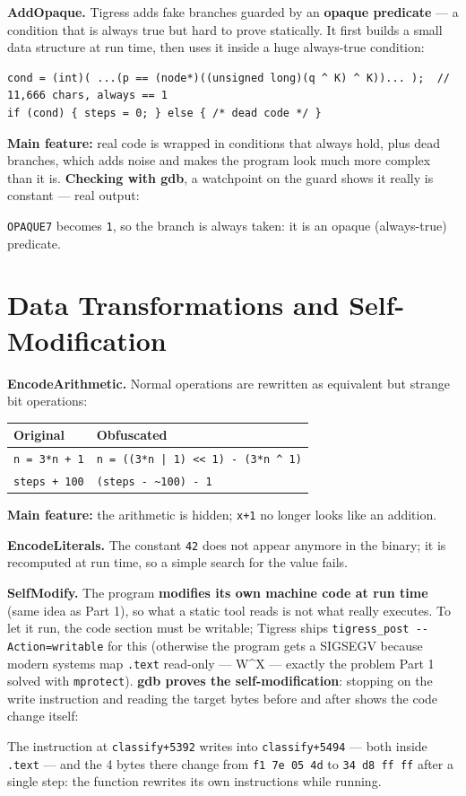 \documentclass[11pt,a4paper]{article}
\newcommand{\code}[1]{\texttt{\small #1}}
\begin{document}
\textbf{AddOpaque.} Tigress adds fake branches guarded by an \textbf{opaque predicate} --- a condition
that is always true but hard to prove statically. It first builds a small data structure at run time,
then uses it inside a huge always-true condition:
\begin{lstlisting}
cond = (int)( ...(p == (node*)((unsigned long)(q ^ K) ^ K))... );  // 11,666 chars, always == 1
if (cond) { steps = 0; } else { /* dead code */ }
\end{lstlisting}
\textbf{Main feature:} real code is wrapped in conditions that always hold, plus dead branches, which
adds noise and makes the program look much more complex than it is. \textbf{Checking with gdb}, a
watchpoint on the guard shows it really is constant --- real output:

\code{OPAQUE7} becomes \code{1}, so the branch is always taken: it is an opaque (always-true) predicate.

\section{Data Transformations and Self-Modification}
\textbf{EncodeArithmetic.} Normal operations are rewritten as equivalent but strange bit operations:
\begin{center}\small
\begin{tabular}{@{}ll@{}}
\toprule \textbf{Original} & \textbf{Obfuscated} \\ \midrule
\code{n = 3*n + 1} & \code{n = ((3*n | 1) << 1) - (3*n \^{} 1)} \\
\code{steps + 100} & \code{(steps - \~{}100) - 1} \\ \bottomrule
\end{tabular}
\end{center}
\textbf{Main feature:} the arithmetic is hidden; \code{x+1} no longer looks like an addition.

\textbf{EncodeLiterals.} The constant \code{42} does not appear anymore in the binary; it is
recomputed at run time, so a simple search for the value fails.

\textbf{SelfModify.} The program \textbf{modifies its own machine code at run time} (same idea as
Part 1), so what a static tool reads is not what really executes. To let it run, the code section
must be writable; Tigress ships \code{tigress\_post -{}-Action=writable} for this (otherwise the
program gets a SIGSEGV because modern systems map \code{.text} read-only --- W\^{}X --- exactly the
problem Part 1 solved with \code{mprotect}). \textbf{gdb proves the self-modification}: stopping on the
write instruction and reading the target bytes before and after shows the code change itself:

The instruction at \code{classify+5392} writes into \code{classify+5494} --- both inside \code{.text}
--- and the 4 bytes there change from \code{f1 7e 05 4d} to \code{34 d8 ff ff} after a single step:
the function rewrites its own instructions while running.
\end{document}

